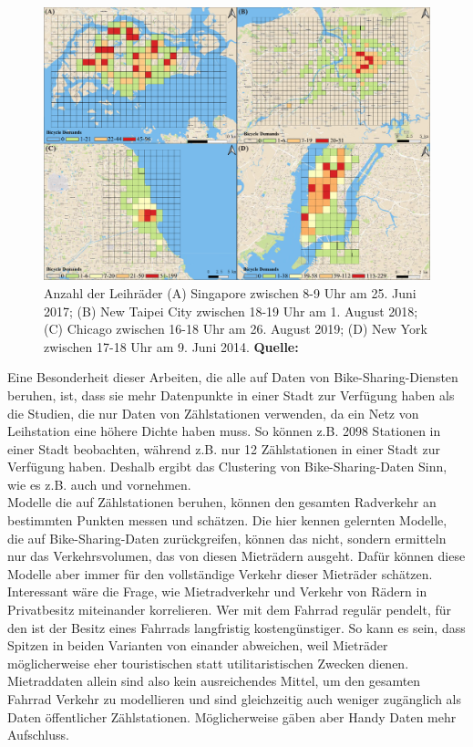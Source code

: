 \documentclass[a4paper,12pt]{thesis}
\begin{document}
\begin{figure}[!ht]
	\centering
	\includegraphics[width=\textwidth]{Plots/Li2022.png}
	\caption[ Anzahl der Leihräder ]{Anzahl der Leihräder (A) Singapore zwischen 8-9 Uhr am 25. Juni 2017; (B) New Taipei City zwischen 18-19 Uhr am 1. August 2018; (C) Chicago zwischen 16-18 Uhr am 26. August 2019; (D) New York zwischen 17-18 Uhr am 9. Juni 2014. \textbf{Quelle: \cite{Li2022}}}
	\label{LiBild}
\end{figure}
Eine Besonderheit dieser Arbeiten, die alle auf Daten von Bike-Sharing-Diensten beruhen, ist, dass sie mehr Datenpunkte in einer Stadt zur Verfügung haben als die Studien, die nur Daten von Zählstationen verwenden, da ein Netz von Leihstation eine höhere Dichte haben muss. So können \cite{Gao2022} z.B. 2098 Stationen in einer Stadt beobachten, während \cite{Broucke2019} z.B. nur 12 Zählstationen in einer Stadt zur Verfügung haben. Deshalb ergibt das Clustering von Bike-Sharing-Daten Sinn, wie es z.B. auch \cite{Xu2013} und \cite{Li2015} vornehmen.\\
Modelle die auf Zählstationen beruhen, können den gesamten Radverkehr an bestimmten Punkten messen und schätzen. Die hier kennen gelernten Modelle, die auf Bike-Sharing-Daten zurückgreifen, können das nicht, sondern ermitteln nur das Verkehrsvolumen, das von diesen Mieträdern ausgeht. Dafür können diese Modelle aber immer für den vollständige Verkehr dieser Mieträder schätzen. Interessant wäre die Frage, wie Mietradverkehr und Verkehr von Rädern in Privatbesitz miteinander korrelieren. Wer mit dem Fahrrad regulär pendelt, für den ist der Besitz eines Fahrrads langfristig kostengünstiger. So kann es sein, dass Spitzen in beiden Varianten von einander abweichen, weil Mieträder möglicherweise eher touristischen statt utilitaristischen Zwecken dienen. Mietraddaten allein sind also kein ausreichendes Mittel, um den gesamten Fahrrad Verkehr zu modellieren und sind gleichzeitig auch weniger zugänglich als Daten öffentlicher Zählstationen. Möglicherweise gäben aber Handy Daten mehr Aufschluss.
\end{document}
